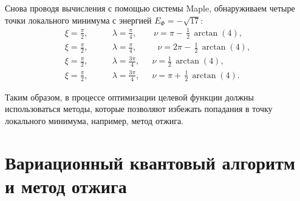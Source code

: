 \documentclass[a4paper]{report}
\begin{document}
Снова проводя вычисления с помощью системы Maple, обнаруживаем четыре точки локального минимума с энергией ${E_\Phi=-\sqrt{17}}$:
\begin{align*}
\xi=\frac{\pi}{2}, &\qquad\lambda=\frac{\pi}{4}, \qquad \nu=\pi-\,\frac{1}{2}\,\arctan(4),\\
\xi=\frac{\pi}{2}, &\qquad\lambda=\frac{\pi}{4}, \qquad\:\! \!\!\:\nu=2\pi-\,\frac{1}{2}\,\arctan(4),\\
\xi=\frac{\pi}{2}, &\qquad\lambda=\frac{3\pi}{4}, \quad\;\, \nu=\frac{1}{2}\,\arctan(4),\\
\xi=\frac{\pi}{2}, &\qquad\lambda=\frac{3\pi}{4}, \quad\;\, \nu=\pi+\,\frac{1}{2}\,\arctan(4).
\end{align*}

Таким образом, в процессе оптимизации целевой функции должны использоваться методы, которые позволяют избежать попадания в точку локального минимума, например, метод отжига.



\chapter{Вариационный квантовый алгоритм и метод отжига}

\end{document}
